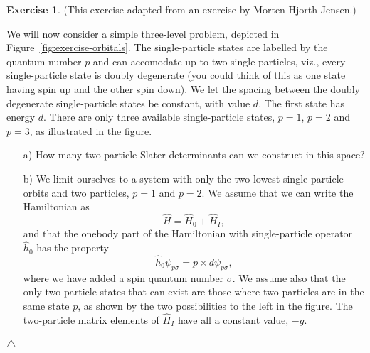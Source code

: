 \documentclass{report}
\theoremstyle{plain}
\theoremstyle{definition}
\newtheorem{exerc}{Exercise}[chapter]
\newcommand\xqed[1]{%
  \leavevmode\unskip\penalty9999 \hbox{}\nobreak\hfill
  \quad\hbox{#1}}
\newcommand\demo{\xqed{$\triangle$}}
\newenvironment{exercise}{\bigskip\begin{exerc}}{\demo\end{exerc}\bigskip}
\begin{document}
\begin{exercise}%
 (This exercise adapted from an exercise by Morten Hjorth-Jensen.)

  We will now consider a simple three-level problem, depicted in
  Figure~\ref{fig:exercise-orbitals}.  The single-particle
  states are labelled by the quantum number $p$ and can accomodate up
  to two single particles, viz., every single-particle state is doubly
  degenerate (you could think of this as one state having spin up and
  the other spin down).  We let the spacing between the doubly
  degenerate single-particle states be constant, with value $d$.  The
  first state has energy $d$. There are only three available
  single-particle states, $p=1$, $p=2$ and $p=3$, as illustrated in
  the figure.
\begin{enumerate}
\item[a)] How many two-particle Slater determinants can we construct in this space? 
\item[b)] We limit ourselves to a system with only the two lowest single-particle orbits and two particles, $p=1$ and $p=2$.
We assume that we can write the Hamiltonian as
\[
       \hat{H}=\hat{H}_0+\hat{H}_I,
\]
and that the onebody part of the Hamiltonian with single-particle operator $\hat{h}_0$ has the property
\[
\hat{h}_0\psi_{p\sigma} = p\times d \psi_{p\sigma},
\]
where we have added a spin quantum number $\sigma$. 
We assume also that the only two-particle states that can exist are those where two particles are in the 
same state $p$, as shown by the two possibilities to the left in the figure.
The two-particle matrix elements of $\hat{H}_I$ have all a constant value, $-g$.
\begin{figure}
  \begin{center}
\end{center}
\end{figure}
\end{enumerate}
\end{exercise}
\end{document}
